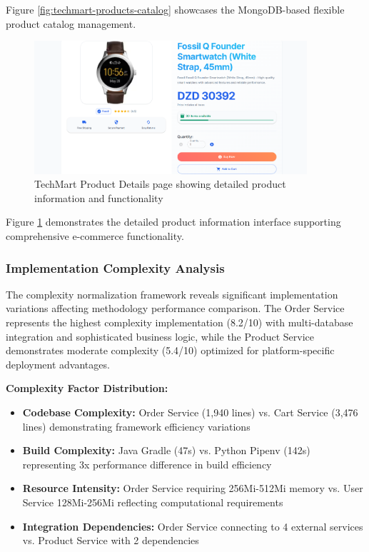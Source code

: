 Figure \ref{fig:techmart-products-catalog} showcases the MongoDB-based flexible product catalog management.

\begin{figure}[H]
\centering
\includegraphics[width=0.9\textwidth]{figures/chapter5/techmart-product-details.png}
\caption{TechMart Product Details page showing detailed product information and functionality}
\label{fig:techmart-product-details}
\end{figure}

Figure \ref{fig:techmart-product-details} demonstrates the detailed product information interface supporting comprehensive e-commerce functionality.

\subsubsection{Implementation Complexity Analysis}

The complexity normalization framework reveals significant implementation variations affecting methodology performance comparison. The Order Service represents the highest complexity implementation (8.2/10) with multi-database integration and sophisticated business logic, while the Product Service demonstrates moderate complexity (5.4/10) optimized for platform-specific deployment advantages.

\textbf{Complexity Factor Distribution:}
\begin{itemize}
\item \textbf{Codebase Complexity:} Order Service (1,940 lines) vs. Cart Service (3,476 lines) demonstrating framework efficiency variations
\item \textbf{Build Complexity:} Java Gradle (47s) vs. Python Pipenv (142s) representing 3x performance difference in build efficiency
\item \textbf{Resource Intensity:} Order Service requiring 256Mi-512Mi memory vs. User Service 128Mi-256Mi reflecting computational requirements
\item \textbf{Integration Dependencies:} Order Service connecting to 4 external services vs. Product Service with 2 dependencies
\end{itemize}

